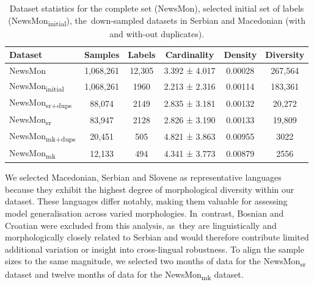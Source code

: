 \documentclass[make,article,accept,pdftex,moreauthors]{Definitions/mdpi}
\begin{document}
\renewcommand{\arraystretch}{1.1}
\begin{table}[H]
   
    \caption{Dataset statistics for the complete set (NewsMon), selected initial set of labels (NewsMon\textsubscript{initial}), the~down-sampled datasets in Serbian and Macedonian (with and with-\linebreak out duplicates).}
        \begin{tabularx}{\textwidth}{lCcCcC}
            \toprule
            \textbf{Dataset} & \textbf{Samples} & \textbf{Labels} & \textbf{Cardinality} & \textbf{Density} & \textbf{Diversity} \\
            \midrule
           
            NewsMon & 1,068,261 & 12,305 & 3.392 ± 4.017 & 0.00028 & 267,564 \\
            NewsMon\textsubscript{initial} & 1,068,261 & 1960 & 2.213 ± 2.316 & 0.00114 & 183,361 \\
            \midrule
            NewsMon\textsubscript{sr+dups} & 88,074 & 2149 & 2.835 ± 3.181 & 0.00132 & 20,272 \\
            NewsMon\textsubscript{sr} & 83,947 & 2128 & 2.826 ± 3.190 & 0.00133 & 19,809 \\
            \midrule
            NewsMon\textsubscript{mk+dups} & 20,451 & 505 & 4.821 ± 3.863 & 0.00955 & 3022 \\
            NewsMon\textsubscript{mk} & 12,133 & 494 & 4.341 ± 3.773 & 0.00879 & 2556 \\
            \bottomrule
        \end{tabularx}
    \label{tab:sr_mk_dataset_statistics}
\end{table}
We selected Macedonian, Serbian and Slovene as representative languages because they exhibit the highest degree of morphological diversity within our dataset. These languages differ notably, making them valuable for assessing model generalisation across varied morphologies. In~contrast, Bosnian and Croatian were excluded from this analysis, as~they are linguistically and morphologically closely related to Serbian and would therefore contribute limited additional variation or insight into cross-lingual robustness. 
To align the sample sizes to the same magnitude, we selected two months of data for the NewsMon\textsubscript{sr} dataset and twelve months of data for the NewsMon\textsubscript{mk} dataset.
\vspace{-3pt}
\end{document}
